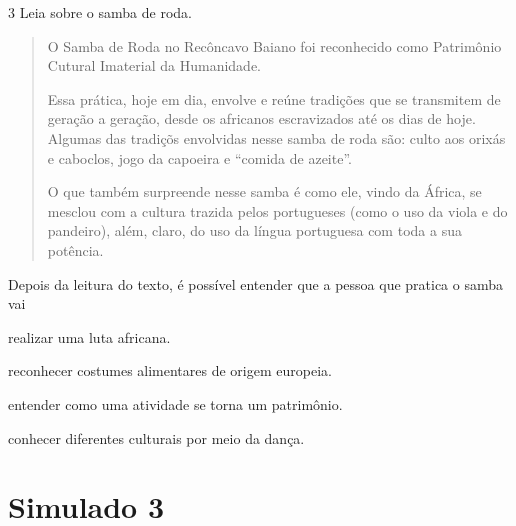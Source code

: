 \num{3} Leia sobre o samba de roda.
\begin{quote}
O Samba de Roda no Recôncavo Baiano foi reconhecido como Patrimônio Cutural Imaterial da Humanidade.

Essa prática, hoje em dia, envolve e reúne tradições que se transmitem de geração a geração, desde os africanos escravizados até os dias de hoje. Algumas das tradiçõs envolvidas nesse samba de roda são: culto aos orixás e caboclos, jogo da capoeira e “comida de azeite”.

O que também surpreende nesse samba é como ele, vindo da África, se mesclou com a cultura trazida pelos portugueses (como o uso da viola e do pandeiro), além, claro, do uso da língua portuguesa com toda a sua potência.


\end{quote}

\noindent{}Depois da leitura do texto, é possível entender que a pessoa que pratica o samba vai

\begin{escolha}
\item realizar uma luta africana.

\item reconhecer costumes alimentares de origem europeia.

\item entender como uma atividade se torna um patrimônio.

\item conhecer diferentes culturais por meio da dança.
\end{escolha}


\chapter{Simulado 3}

